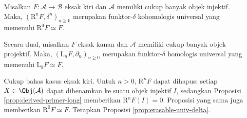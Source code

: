 \begin{korolari}\label{prop:derived-erasable}
	Misalkan $F: \mathcal{A} \to \mathcal{B}$ eksak kiri dan $\mathcal{A}$ memiliki cukup banyak objek injektif. Maka, $(\mathrm{R}^n F, \delta^n)_{n \geq 0}$ merupakan funktor-$\delta$ kohomologis universal yang memenuhi $\mathrm{R}^0 F \simeq F$.
	
	Secara dual, misalkan $F$ eksak kanan dan $\mathcal{A}$ memiliki cukup banyak objek projektif. Maka, $(\mathrm{L}_n F, \partial_n)_{n \geq 0}$ merupakan funktor-$\delta$ homologis universal yang memenuhi $\mathrm{L}_0 F \simeq F$.
\end{korolari}
\begin{bukti}
	Cukup bahas kasus eksak kiri. Untuk $n > 0$, $\mathrm{R}^n F$ dapat dihapus: setiap $X \in \Obj(\mathcal{A})$ dapat dibenamkan ke suatu objek injektif $I$, sedangkan Proposisi \ref{prop:derived-primer-long} memberikan $\mathrm{R}^n F(I) = 0$. Proposisi yang sama juga memberikan $\mathrm{R}^0 F \simeq F$. Terapkan Proposisi \ref{prop:erasable-univ-delta}.
\end{bukti}
